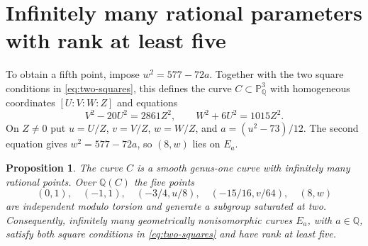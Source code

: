 \documentclass[11pt,leqno,oneside,letterpaper]{amsart}
\newtheorem{proposition}[theorem]{Proposition}
\theoremstyle{remark}
\numberwithin{equation}{section}
\newcommand{\Q}{\mathbb Q}
\begin{document}

\section{Infinitely many rational parameters with rank at least five}

To obtain a fifth point, impose $w^2=577-72a$. Together with the two square conditions in \eqref{eq:two-squares}, this defines the curve $C\subset\mathbb P^3_{\Q}$ with homogeneous coordinates $[U:V:W:Z]$ and equations
\begin{equation}\label{eq:rank-five-base}
  V^2-20U^2=2861Z^2,\qquad W^2+6U^2=1015Z^2.
\end{equation}
On $Z\ne0$ put $u=U/Z$, $v=V/Z$, $w=W/Z$, and $a=(u^2-73)/12$. The second equation gives $w^2=577-72a$, so $(8,w)$ lies on $E_a$.

\begin{proposition}\label{prop:rank-five-rational}
  The curve $C$ is a smooth genus-one curve with infinitely many rational points. Over $\Q(C)$ the five points
  \[
    (0,1),\quad(-1,1),\quad(-3/4,u/8),\quad(-15/16,v/64),\quad(8,w)
  \]
  are independent modulo torsion and generate a subgroup saturated at two. Consequently, infinitely many geometrically nonisomorphic curves $E_a$, with $a\in\Q$, satisfy both square conditions in \eqref{eq:two-squares} and have rank at least five.
\end{proposition}
\end{document}
